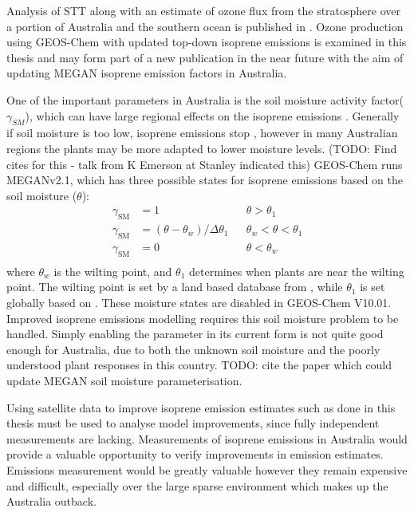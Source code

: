   Analysis of STT along with an estimate of ozone flux from the stratosphere over a portion of Australia and the southern ocean is published in \textcite{Greenslade2017}.
  Ozone production using GEOS-Chem with updated top-down isoprene emissions is examined in this thesis and may form part of a new publication in the near future with the aim of updating MEGAN isoprene emission factors in Australia.
  
  One of the important parameters in Australia is the soil moisture activity factor($\gamma_{SM}$), which can have large regional effects on the isoprene emissions \parencite{Sindelarova2014,Bauwens2016}.
  Generally if soil moisture is too low, isoprene emissions stop \parencite{Pegoraro2004,Niinemets2010}, however in many Australian regions the plants may be more adapted to lower moisture levels. (TODO: Find cites for this - talk from K Emerson at Stanley indicated this)
  GEOS-Chem runs MEGANv2.1, which has three possible states for isoprene emissions based on the soil moisture ($\theta$):
  \begin{align*}
  \gamma_\mathrm{SM} & = 1 && \theta > \theta_1 \\
  \gamma_\mathrm{SM} & = (\theta-\theta_w)/\Delta\theta_1  && \theta_w < \theta < \theta_1 \\
  \gamma_\mathrm{SM} & = 0 && \theta < \theta_w \\
  \end{align*}
  where $\theta_w$ is the wilting point, and $\theta_1$ determines when plants are near the wilting point.
  The wilting point is set by a land based database from \textcite{Chen2001}, while $\theta_1$ is set globally based on \textcite{Pegoraro2004}.
  These moisture states are disabled in GEOS-Chem V10.01.
  Improved isoprene emissions modelling requires this soil moisture problem to be handled.
  Simply enabling the parameter in its current form is not quite good enough for Australia, due to both the unknown soil moisture and the poorly understood plant responses in this country.
  TODO: cite the paper which could update MEGAN soil moisture parameterisation.
  
  Using satellite data to improve isoprene emission estimates such as done in this thesis must be used to analyse model improvements, since fully independent measurements are lacking.
  Measurements of isoprene emissions in Australia would provide a valuable opportunity to verify improvements in emission estimates.
  Emissions measurement would be greatly valuable however they remain expensive and difficult, especially over the large sparse environment which makes up the Australia outback.